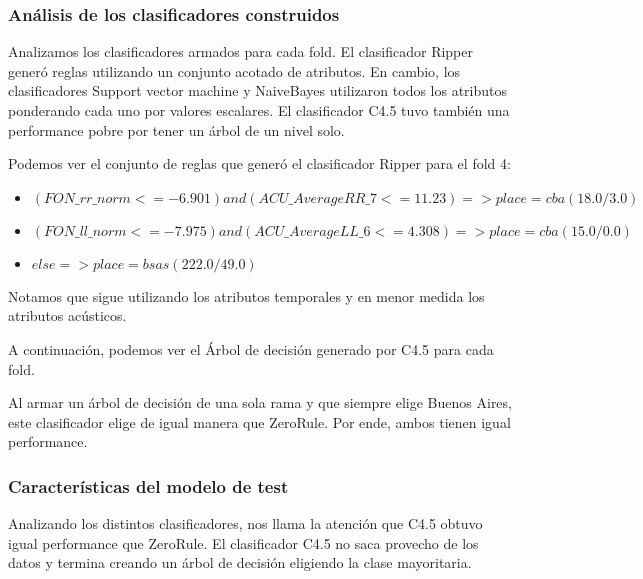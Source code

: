 \subsubsection{Análisis de los clasificadores construidos}

Analizamos los clasificadores armados para cada fold. El clasificador Ripper generó reglas utilizando un conjunto acotado de atributos. En cambio, los clasificadores Support vector machine y NaiveBayes utilizaron todos los atributos ponderando cada uno por valores escalares. El clasificador C4.5 tuvo también una performance pobre por tener un árbol de un nivel solo.  

Podemos ver el conjunto de reglas que generó el clasificador Ripper para el fold 4:

\begin{flushleft}
	\begin{itemize}
		\item $(FON\_rr\_norm <= -6.901) and (ACU\_AverageRR\_7 <= 11.23) => place=cba (18.0/3.0)$ \\
		\item $(FON\_ll\_norm <= -7.975) and (ACU\_AverageLL\_6 <= 4.308) => place=cba (15.0/0.0)$
		\item $else => place=bsas (222.0/49.0)$
	\end{itemize}
\end{flushleft}

Notamos que sigue utilizando los atributos temporales y en menor medida los atributos acústicos.

A continuación, podemos ver el Árbol de decisión generado por C4.5 para cada fold. 


Al armar un árbol de decisión de una sola rama y que siempre elige Buenos Aires, este clasificador elige de igual manera que ZeroRule. Por ende, ambos tienen igual performance.

\subsubsection{Características del modelo de test}


Analizando los distintos clasificadores, nos llama la atención que C4.5 obtuvo igual performance que ZeroRule. El clasificador C4.5 no saca provecho de los datos y termina creando un árbol de decisión eligiendo la clase mayoritaria.

